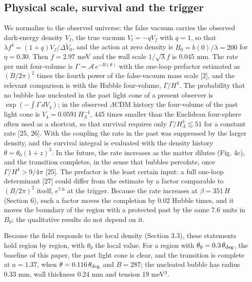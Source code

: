 \documentclass[preprint,12pt]{elsarticle}
\begin{document}
\subsection{Physical scale, survival and the trigger}
We normalize to the observed universe: the false vacuum carries the observed dark-energy density $V_f$, the true vacuum $V_t=-qV_f$ with $q=1$, so that $\lambda f^4=(1+q)V_f/\Delta\tilde V_0$, and the action at zero density is $B_0=b(0)/\lambda=200$ for $\eta=0.30$. Then $f=2.97$ meV and the wall scale $1/\sqrt\lambda f$ is 0.045 mm. The rate per unit four-volume is $\Gamma=\mathcal A\,e^{-B(\theta)}$ with the one-loop prefactor estimated as $(B/2\pi)^2$ times the fourth power of the false-vacuum mass scale [2], and the relevant comparison is with the Hubble four-volume, $\Gamma/H^4$. The probability that no bubble has nucleated in the past light cone of a present observer is $\exp(-\int\Gamma\,dV_4)$; in the observed $\Lambda$CDM history the four-volume of the past light cone is $V_4=0.0591\,H_\Lambda^{-4}$, 445 times smaller than the Euclidean four-sphere often used as a shortcut, so that survival requires only $\Gamma/H_\Lambda^4\lesssim51$ for a constant rate [25, 26]. With the coupling the rate in the past was suppressed by the larger density, and the survival integral is evaluated with the density history $\theta=\theta_0(1+z)^3$. In the future, the rate increases as the matter dilutes (Fig. 4c), and the transition completes, in the sense that bubbles percolate, once $\Gamma/H^4>9/4\pi$ [25]. The prefactor is the least certain input: a full one-loop determinant [27] could differ from the estimate by a factor comparable to $(B/2\pi)^2$ itself, $e^{7.6}$ at the trigger. Because the rate increases at $\beta=351\,H$ (Section 6), such a factor moves the completion by 0.02 Hubble times, and it moves the boundary of the region with a protected past by the same 7.6 units in $B_0$; the qualitative results do not depend on it.

Because the field responds to the local density (Section 3.3), these statements hold region by region, with $\theta_0$ the local value. For a region with $\theta_0=0.3\,\theta_{\rm deg}$, the baseline of this paper, the past light cone is clear, and the transition is complete at $a=1.37$, when $\theta=0.116\,\theta_{\rm deg}$ and $B=287$; the nucleated bubble has radius 0.33 mm, wall thickness 0.24 mm and tension 19 meV$^3$.
\end{document}
